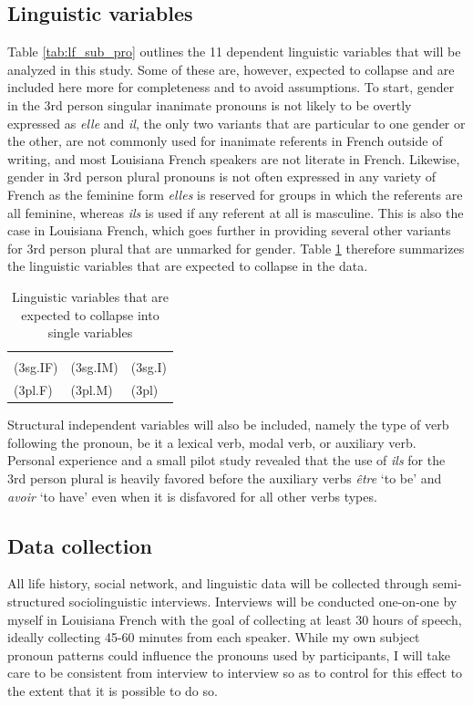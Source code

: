 \documentclass{article}\usepackage[]{graphicx}\usepackage[]{xcolor}
\newcommand{\lexi}[1]{\textit{#1}}
\newcommand{\gloss}[1]{`#1'}
\begin{document}
    \subsection{Linguistic variables}
      Table \ref{tab:lf_sub_pro} outlines the 11 dependent linguistic variables that will be analyzed in this study.
      Some of these are, however, expected to collapse and are included here more for completeness and to avoid assumptions.
      To start, gender in the 3rd person singular inanimate pronouns is not likely to be overtly expressed as \lexi{elle} and \lexi{il}, the only two variants that are particular to one gender or the other, are not commonly used for inanimate referents in French outside of writing, and most Louisiana French speakers are not literate in French.
      Likewise, gender in 3rd person plural pronouns is not often expressed in any variety of French as the feminine form \lexi{elles} is reserved for groups in which the referents are all feminine, whereas \lexi{ils} is used if any referent at all is masculine.
      This is also the case in Louisiana French, which goes further in providing several other variants for 3rd person plural that are unmarked for gender.
      Table \ref{tab:lf_pro_collapse} therefore summarizes the linguistic variables that are expected to collapse in the data.

      \begin{table}[tbhp]
        \centering
        \caption{Linguistic variables that are expected to collapse into single variables}
        \label{tab:lf_pro_collapse}
        \begin{tabular}{l @{ + } l @{ $\to$ } l}
          \multicolumn{3}{c}{} \\
          (3sg.IF) & (3sg.IM) & (3sg.I) \\
          (3pl.F)  & (3pl.M)  & (3pl)
        \end{tabular}
      \end{table}

      Structural independent variables will also be included, namely the type of verb following the pronoun, be it a lexical verb, modal verb, or auxiliary verb.
      Personal experience and a small pilot study revealed that the use of \lexi{ils} for the 3rd person plural is heavily favored before the auxiliary verbs \lexi{être} \gloss{to be} and \lexi{avoir} \gloss{to have} even when it is disfavored for all other verbs types.

    \subsection{Data collection}
      All life history, social network, and linguistic data will be collected through semi-structured sociolinguistic interviews.
      Interviews will be conducted one-on-one by myself in Louisiana French with the goal of collecting at least 30 hours of speech, ideally collecting 45-60 minutes from each speaker.
      While my own subject pronoun patterns could influence the pronouns used by participants, I will take care to be consistent from interview to interview so as to control for this effect to the extent that it is possible to do so.
\end{document}
